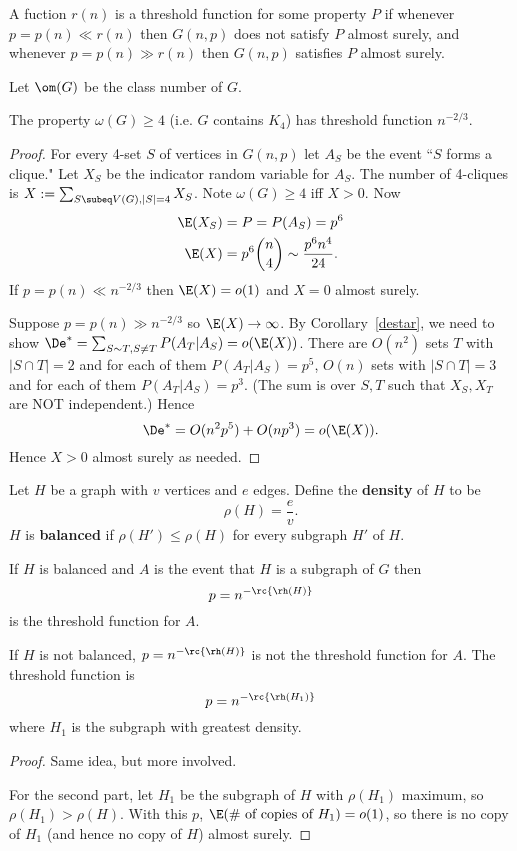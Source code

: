 \begin{df}
A fuction $r(n)$ is a threshold function for some property $P$ if whenever $p=p(n)\ll r(n)$ then $G(n,p)$ does not satisfy $P$ almost surely, and whenever $p=p(n)\gg r(n)$ then $G(n,p)$ satisfies $P$ almost surely. 
\end{df}
Let $\om(G)$ be the class number of $G$.
\begin{thm}
The property $\omega(G)\geq 4$ (i.e. $G$ contains $K_4$) has threshold function $n^{-2/3}$.
\end{thm}
\begin{proof}
For every 4-set $S$ of vertices in $G(n,p)$ let $A_S$ be the event ``$S$ forms a clique." Let $X_S$ be the indicator random variable for $A_S$. The number of 4-cliques is $X:=\sum_{S\subeq V(G), |S|=4}X_S$. Note $\omega(G)\geq 4$ iff $X>0$. Now
\begin{align*}
\E(X_S)&=P=P(A_S)=p^6\\
\E(X)&=p^6 \binom n4 \sim \frac{p^6n^4}{24}.
\end{align*}
If $p=p(n)\ll n^{-2/3}$ then $\E(X)=o(1)$ and $X=0$ almost surely.

Suppose $p=p(n)\gg n^{-2/3}$ so $\E(X)\to \infty$. By Corollary~\ref{destar}, we need to show $\De^*=\sum_{S\sim T,S\neq T}P(A_T|A_S)=o(\E(X))$. There are $O(n^2)$ sets $T$ with $|S\cap T|=2$ and for each of them $P(A_T|A_S)=p^5$, $O(n)$ sets with $|S\cap T|=3$ and for each of them $P(A_T|A_S)=p^3$. (The sum is over $S,T$ such that $X_S,X_T$ are NOT independent.)
Hence
\[
\De^*=O(n^2p^5)+O(np^3)=o(\E(X)).
\]
Hence $X>0$ almost surely as needed.
\end{proof}

\begin{df}
Let $H$ be a graph with $v$ vertices and $e$ edges. Define the \textbf{density} of $H$ to be
\[
\rho(H)=\frac{e}{v}.
\]
$H$ is \textbf{balanced} if $\rho(H')\leq \rho(H)$ for every subgraph $H'$ of $H$.
\end{df}

\begin{thm}
If $H$ is balanced and $A$ is the event that $H$ is a subgraph of $G$ then
\[
p=n^{-\rc{\rh(H)}}
\]
is the threshold function for $A$.

If $H$ is not balanced, $p=n^{-\rc{\rh(H)}}$ is not the threshold function for $A$. The threshold function is
\[
p=n^{-\rc{\rh(H_1)}}
\]
where $H_1$ is the subgraph with greatest density.
\end{thm}
\begin{proof}
Same idea, but more involved.

For the second part, let $H_1$ be the subgraph of $H$ with $\rho(H_1)$ maximum, so $\rho(H_1)>\rho(H)$. With this $p$, $\E(\# \text{ of copies of }H_1)=o(1)$, so there is no copy of $H_1$ (and hence no copy of $H$) almost surely.
\end{proof}

